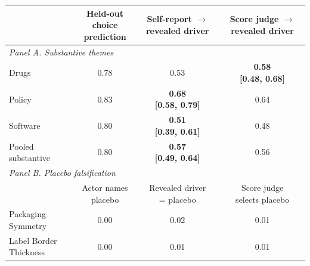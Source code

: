 \begin{tabular}{lccc}
\toprule
 & \shortstack[c]{Held-out choice\\prediction} & \shortstack[c]{Self-report $\to$\\revealed driver} & \shortstack[c]{Score judge $\to$\\revealed driver} \\
\midrule
\multicolumn{4}{l}{\textit{Panel A. Substantive themes}} \\
Drugs & \shortstack[c]{0.78\\[0.74, 0.82]} & \shortstack[c]{0.53\\[0.42, 0.62]} & \shortstack[c]{\textbf{0.58}\\\textbf{[0.48, 0.68]}} \\
Policy & \shortstack[c]{0.83\\[0.79, 0.87]} & \shortstack[c]{\textbf{0.68}\\\textbf{[0.58, 0.79]}} & \shortstack[c]{0.64\\[0.50, 0.75]} \\
Software & \shortstack[c]{0.80\\[0.75, 0.85]} & \shortstack[c]{\textbf{0.51}\\\textbf{[0.39, 0.61]}} & \shortstack[c]{0.48\\[0.33, 0.58]} \\
Pooled substantive & \shortstack[c]{0.80\\[0.77, 0.83]} & \shortstack[c]{\textbf{0.57}\\\textbf{[0.49, 0.64]}} & \shortstack[c]{0.56\\[0.48, 0.63]} \\
\midrule
\multicolumn{4}{l}{\textit{Panel B. Placebo falsification}} \\
 & \shortstack[c]{Actor names\\placebo} & \shortstack[c]{Revealed driver\\= placebo} & \shortstack[c]{Score judge\\selects placebo} \\
\midrule
Packaging Symmetry & \shortstack[c]{0.00\\[0.00, 0.01]} & \shortstack[c]{0.02\\[0.00, 0.05]} & \shortstack[c]{0.01\\[0.00, 0.04]} \\
Label Border Thickness & \shortstack[c]{0.00\\[0.00, 0.00]} & \shortstack[c]{0.01\\[0.00, 0.03]} & \shortstack[c]{0.01\\[0.00, 0.03]} \\
\bottomrule
\end{tabular}
